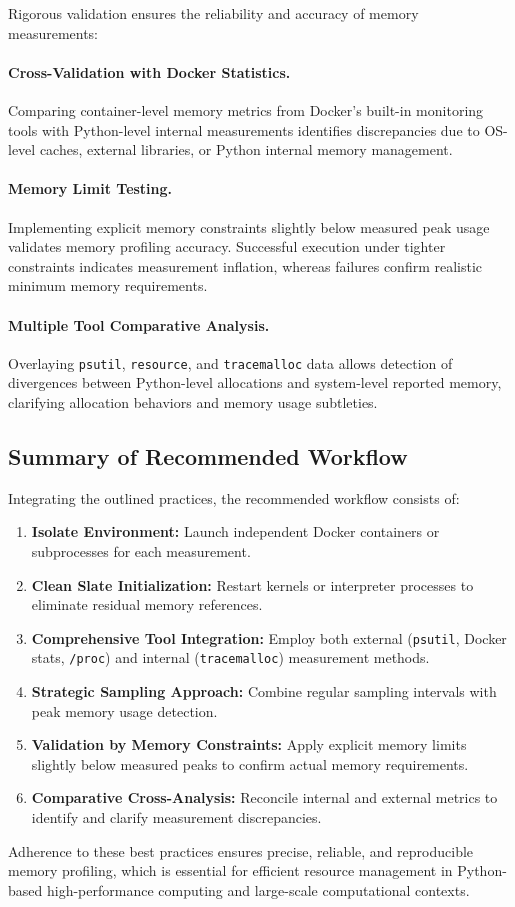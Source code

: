 Rigorous validation ensures the reliability and accuracy of memory measurements:

\paragraph{Cross-Validation with Docker Statistics.}
Comparing container-level memory metrics from Docker's built-in monitoring tools with Python-level internal measurements identifies discrepancies due to \ac{OS}-level caches, external libraries, or Python internal memory management.

\paragraph{Memory Limit Testing.}
Implementing explicit memory constraints slightly below measured peak usage validates memory profiling accuracy.
Successful execution under tighter constraints indicates measurement inflation, whereas failures confirm realistic minimum memory requirements.

\paragraph{Multiple Tool Comparative Analysis.}
Overlaying \texttt{psutil}, \texttt{resource}, and \texttt{tracemalloc} data allows detection of divergences between Python-level allocations and system-level reported memory, clarifying allocation behaviors and memory usage subtleties.

\subsection{Summary of Recommended Workflow}
\label{subsec:mmc-bestpractices-summary}

Integrating the outlined practices, the recommended workflow consists of:

\begin{enumerate}
    \item \textbf{Isolate Environment:} Launch independent Docker containers or subprocesses for each measurement.
    \item \textbf{Clean Slate Initialization:} Restart kernels or interpreter processes to eliminate residual memory references.
    \item \textbf{Comprehensive Tool Integration:} Employ both external (\texttt{psutil}, Docker stats, \texttt{/proc}) and internal (\texttt{tracemalloc}) measurement methods.
    \item \textbf{Strategic Sampling Approach:} Combine regular sampling intervals with peak memory usage detection.
    \item \textbf{Validation by Memory Constraints:} Apply explicit memory limits slightly below measured peaks to confirm actual memory requirements.
    \item \textbf{Comparative Cross-Analysis:} Reconcile internal and external metrics to identify and clarify measurement discrepancies.
\end{enumerate}

Adherence to these best practices ensures precise, reliable, and reproducible memory profiling, which is essential for efficient resource management in Python-based high-performance computing and large-scale computational contexts.